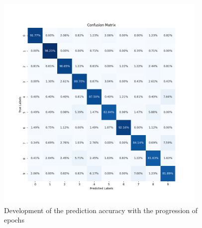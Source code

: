 \documentclass[onecolumn,10pt,cleanfoot]{asme2ej}
\begin{document}
\begin{figure}[H]
  \centering
	\includegraphics[width=0.9\textwidth, height=0.75\textwidth]{conf_mat_mnist28.png}
	\caption{Development of the prediction accuracy with the progression of epochs}
  \label{fig:MINST_conf}
\end{figure}
\end{document}
